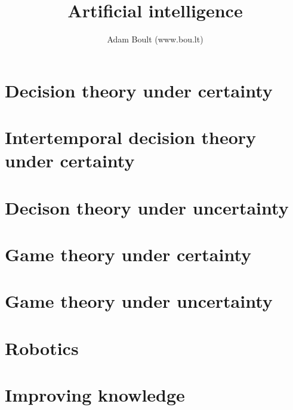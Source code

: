 \documentclass[oneside]{book}
\begin{document}
\author{Adam Boult (www.bou.lt)}
\title{Artificial intelligence}
\maketitle

\setcounter{tocdepth}{1}
\tableofcontents



\part{Decision theory under certainty}




\part{Intertemporal decision theory under certainty}




\part{Decison theory under uncertainty}






\part{Game theory under certainty}




\part{Game theory under uncertainty}



\part{Robotics}



\part{Improving knowledge}



\end{document}
